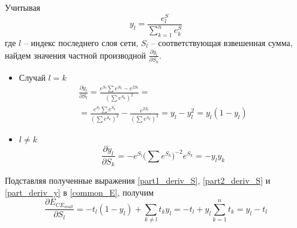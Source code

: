 Учитывая
\begin{equation}
	y_l = \frac{e^S_l}{\sum_{k=1}^{n} e^S_k}
\end{equation}
где $l$ -- индекс последнего слоя сети, $S_l$ -- соответствующая взвешенная сумма, найдем значения частной производной $\frac{\partial y_l}{\partial S_k}$.
\begin{itemize}
	\item Случай $l = k$
	\begin{multline}
		\label{part1_deriv_S}
		\frac{\partial y_l}{\partial S_l} = \frac{e^{S_l}\sum e^{S_k} - e^{2S_l}}{(\sum e^{S_k})^2} = \\ = \frac{e^{S_l}\sum e^{S_k}}{(\sum e^{S_k})^2}-\frac{e^{2S_l}}{(\sum e^{S_k})^2}=y_l - y_l^2 = y_l(1-y_l)
	\end{multline}
	\item $l \neq k$
	\begin{equation}
		\label{part2_deriv_S}
		\frac{\partial y_l}{\partial S_k} = -e^{S_l}\Big(\sum e^{S_k}\Big)^{-2}e^{S_k} = -y_ly_k
	\end{equation}
\end{itemize}

Подставляя полученные выражения \ref{part1_deriv_S}, \ref{part2_deriv_S} и \ref{part_deriv_y} в \ref{common_E}, получим
\begin{equation}
	\frac{\partial E_{CE_{mult}}}{\partial S_l} = -t_l(1-y_l) + \sum_{k\neq l}t_ky_l = -t_l + y_l\sum_{k=1}^{n}t_k = y_l - t_l
\end{equation}

%